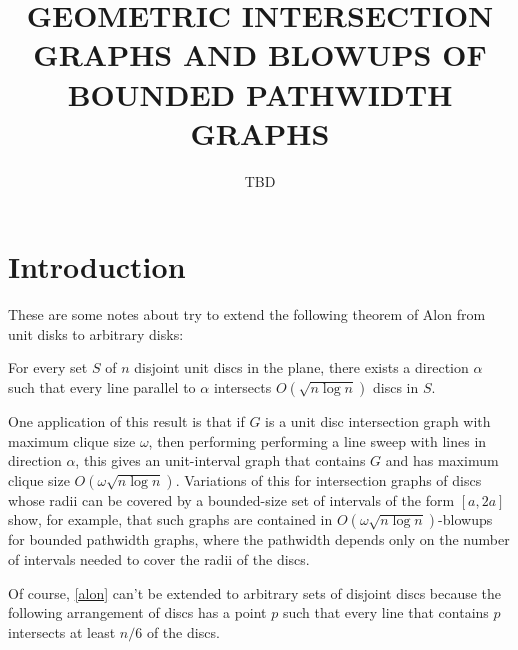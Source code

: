 \documentclass{patmorin}
\title{\MakeUppercase{\boldmath Geometric Intersection Graphs and Blowups of Bounded Pathwidth Graphs}}
\author{TBD}
\date{}
\begin{document}
\maketitle

\section{Introduction}

These are some notes about try to extend the following theorem of Alon from unit disks to arbitrary disks:

\begin{thm}[Alon]\label{alon}
  For every set $S$ of $n$ disjoint unit discs in the plane, there exists a direction $\alpha$ such that every line parallel to $\alpha$ intersects $O(\sqrt{n\log n})$ discs in $S$.
\end{thm}

One application of this result is that if $G$ is a unit disc intersection graph with maximum clique size $\omega$, then performing performing a line sweep with lines in direction $\alpha$, this gives an unit-interval graph that contains $G$ and has maximum clique size $O(\omega \sqrt{n\log n})$.  Variations of this for intersection graphs of discs whose radii can be covered by a bounded-size set of intervals of the form $[a,2a]$ show, for example, that such graphs are contained in $O(\omega\sqrt{n\log n})$-blowups for bounded pathwidth graphs, where the pathwidth depends only on the number of intervals needed to cover the radii of the discs.

Of course, \cref{alon} can't be extended to arbitrary sets of disjoint discs because the following arrangement of discs has a point $p$ such that every line that contains $p$ intersects at least $n/6$ of the discs.
\end{document}
